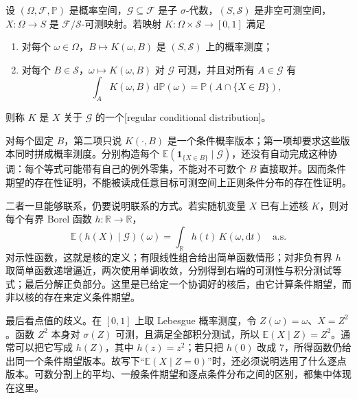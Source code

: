 \begin{definition}\label{b1:def:regular-conditional-distribution-31}
设 \((\Omega,\mathcal F,\mathbb P)\) 是概率空间，\(\mathcal G\subseteq\mathcal F\) 是子 \(\sigma\)-代数，\((S,\mathcal S)\) 是非空可测空间，\(X:\Omega\rightarrow S\) 是 \(\mathcal F/\mathcal S\)-可测映射。若映射
\(K:\Omega\times\mathcal S\rightarrow[0,1]\) 满足
\begin{enumerate}
 \item\label{b1:item:rcd-measure-31}对每个 \(\omega\in\Omega\)，\(B\mapsto K(\omega,B)\) 是 \((S,\mathcal S)\) 上的概率测度；
 \item\label{b1:item:rcd-measurability-31}对每个 \(B\in\mathcal S\)，\(\omega\mapsto K(\omega,B)\) 对 \(\mathcal G\) 可测，并且对所有 \(A\in\mathcal G\) 有
 \[
  \int_A K(\omega,B)\,\mathrm d\mathbb P(\omega)
  =\mathbb P(A\cap\{X\in B\}),
 \]
\end{enumerate}
则称 \(K\) 是 \(X\) 关于 \(\mathcal G\) 的一个[regular conditional distribution]。
\end{definition}

对每个固定 \(B\)，第二项只说 \(K(\cdot,B)\) 是一个条件概率版本；第一项却要求这些版本同时拼成概率测度。分别构造每个 \(\mathbb E(\mathbf1_{\{X\in B\}}\mid\mathcal G)\)，还没有自动完成这种协调：每个等式可能带有自己的例外零集，不能对不可数个 \(B\) 直接取并。因而条件期望的存在性证明，不能被读成任意目标可测空间上正则条件分布的存在性证明。

\ProseParagraphBreak

二者一旦能够联系，仍要说明联系的方式。若实随机变量 \(X\) 已有上述核 \(K\)，则对每个有界 Borel 函数 \(h:\mathbb R\rightarrow\mathbb R\)，
\[
 \mathbb E(h(X)\mid\mathcal G)(\omega)
 =\int_{\mathbb R}h(t)\,K(\omega,\mathrm dt)
 \quad\text{a.s.}
\]
对示性函数，这就是核的定义；有限线性组合给出简单函数情形；对非负有界 \(h\) 取简单函数递增逼近，两次使用单调收敛，分别得到右端的可测性与积分测试等式；最后分解正负部分。这里是已给定一个协调好的核后，由它计算条件期望，而非以核的存在来定义条件期望。

\ProseParagraphBreak

最后看点值的歧义。在 \([0,1]\) 上取 Lebesgue 概率测度，令 \(Z(\omega)=\omega\)、\(X=Z^2\)。函数 \(Z^2\) 本身对 \(\sigma(Z)\) 可测，且满足全部积分测试，所以 \(\mathbb E(X\mid Z)=Z^2\)。通常可以把它写成 \(h(Z)\)，其中 \(h(z)=z^2\)；若只把 \(h(0)\) 改成 \(7\)，所得函数仍给出同一个条件期望版本。故写下“\(\mathbb E(X\mid Z=0)\)”时，还必须说明选用了什么逐点版本。可数分割上的平均、一般条件期望和逐点条件分布之间的区别，都集中体现在这里。
